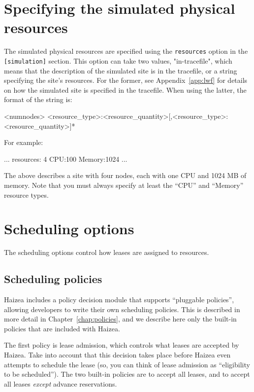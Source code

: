 \section{Specifying the simulated physical resources}

The simulated physical resources are specified using the \texttt{resources} option in the \texttt{[simulation]} section. This option can take two values, "in-tracefile", which means that the description of the simulated site is in the tracefile, or a string specifying the site's resources. For the former, see Appendix~\ref{app:lwf} for details on how the simulated site is specified in the tracefile. When using the latter, the format of the string is:

\begin{wideshellverbatim}
<numnodes> <resource_type>:<resource_quantity>[,<resource_type>:<resource_quantity>]*
\end{wideshellverbatim}
 
For example:

\begin{wideshellverbatim}
[simulation]
...
resources: 4  CPU:100 Memory:1024
...
\end{wideshellverbatim}

The above describes a site with four nodes, each with one CPU and 1024 MB of memory. Note that you must always specify at least the ``CPU'' and ``Memory'' resource types.

\section{Scheduling options}

The scheduling options control how leases are assigned to resources.

\subsection{Scheduling policies}

Haizea includes a policy decision module that supports ``pluggable policies'', allowing developers to write their own scheduling policies. This is described in more detail in Chapter~\ref{chap:policies}, and we describe here only the built-in policies that are included with Haizea.

The first policy is lease admission, which controls what leases are accepted by Haizea. Take into account that this decision takes place before Haizea even attempts to schedule the lease (so, you can think of lease admission as ``eligibility to be scheduled''). The two built-in policies are to accept all leases, and to accept all leases \emph{except} advance reservations.

